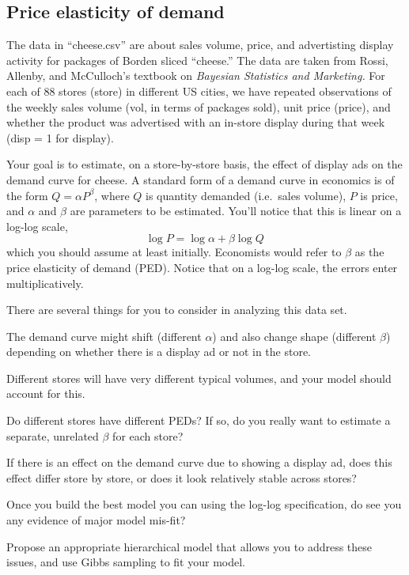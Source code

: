 \documentclass{mynotes}
\begin{document}
\subsection{Price elasticity of demand}

The data in ``cheese.csv'' are about sales volume, price, and advertisting display activity for packages of Borden sliced ``cheese.'' The data are taken from Rossi, Allenby, and McCulloch's textbook on \textit{Bayesian Statistics and Marketing.} For each of 88 stores (store) in different US cities, we have repeated observations of the weekly sales volume (vol, in terms of packages sold), unit price (price), and whether the product was advertised with an in-store display during that week (disp = 1 for display).

Your goal is to estimate, on a store-by-store basis, the effect of display ads on the demand curve for cheese.  A standard form of a demand curve in economics is of the form $Q = \alpha P^\beta$, where $Q$ is quantity demanded (i.e.~sales volume), $P$ is price, and $\alpha$ and $\beta$ are parameters to be estimated.  You'll notice that this is linear on a log-log scale,
$$
\log P = \log \alpha + \beta \log Q \,
$$
which you should assume at least initially.  Economists would refer to $\beta$ as the price elasticity of demand (PED).  Notice that on a log-log scale, the errors enter multiplicatively.

There are several things for you to consider in analyzing this data set.
\begin{compactenum}
\item The demand curve might shift (different $\alpha$) and also change shape (different $\beta$) depending on whether there is a display ad or not in the store.
\item Different stores will have very different typical volumes, and your model should account for this.
\item Do different stores have different PEDs?  If so, do you really want to estimate a separate, unrelated $\beta$ for each store?
\item If there is an effect on the demand curve due to showing a display ad, does this effect differ store by store, or does it look relatively stable across stores?
\item Once you build the best model you can using the log-log specification, do see you any evidence of major model mis-fit?
\end{compactenum}
Propose an appropriate hierarchical model that allows you to address these issues, and use Gibbs sampling to fit your model.
\end{document}
